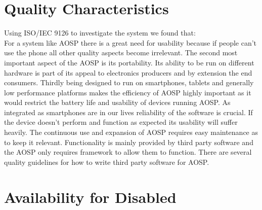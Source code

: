 \documentclass[conference]{IEEEtran}
\begin{document}
\section{Quality Characteristics}
\label{quality}

Using ISO/IEC 9126\cite{jung2004} to investigate the system we found that: \\
For a system like AOSP there is a great need for usability because if people can't use the phone all other quality aspects become irrelevant. The second most important aspect of the AOSP is its portability. Its ability to be run on different hardware is part of its appeal to electronics producers and by extension the end consumers. Thirdly being designed to run on smartphones, tablets and generally low performance platforms makes the efficiency of AOSP highly important as it would restrict the battery life and usability of devices running AOSP. As integrated as smartphones are in our lives reliability of the software is crucial. If the device doesn't perform and function as expected its usability will suffer heavily. The continuous use and expansion of AOSP requires easy maintenance as to keep it relevant. Functionality is mainly provided by third party software and the AOSP only requires framework to allow them to function. There are several quality guidelines for how to write third party software for AOSP.\cite{android-quality}


\section{Availability for Disabled}
\label{availability}

\end{document}
